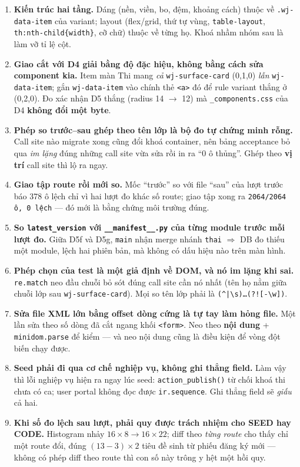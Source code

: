 \begin{enumerate}
\item \textbf{Kiến trúc hai tầng.} Dáng (nền, viền, bo, đệm, khoảng cách) thuộc về
  \texttt{.wj-data-item} của variant; layout (flex/grid, thứ tự vùng, \texttt{table-layout},
  \texttt{th:nth-child\{width\}}, cỡ chữ) thuộc về từng họ. Khoá nhầm nhóm sau là làm vỡ tỉ lệ cột.
\item \textbf{Giao cắt với D4 giải bằng độ đặc hiệu, không bằng cách sửa component kia.} Item màn
  Thi mang \emph{cả} \texttt{wj-surface-card} (0,1,0) \emph{lẫn} \texttt{wj-data-item}; gắn
  \texttt{wj-data-item} vào chính thẻ \texttt{<a>} đó để rule variant thắng ở (0,2,0). Đo xác nhận
  D5 thắng (radius 14 $\to$ 12) mà \texttt{\_components.css} của D4 \textbf{không đổi một byte}.
\item \textbf{Phép so trước--sau ghép theo tên lớp là bộ đo tự chứng minh rỗng.} Call site nào
  migrate xong cũng đổi khoá container, nên bảng acceptance bỏ qua \emph{im lặng} đúng những call
  site vừa sửa rồi in ra ``0 ô thủng''. Ghép theo \textbf{vị trí} call site thì lộ ra ngay.
\item \textbf{Giao tập route rồi mới so.} Mốc ``trước'' so với file ``sau'' của lượt trước báo 378
  ô lệch chỉ vì hai lượt đo khác số route; giao tập xong ra \texttt{2064/2064 ô, 0 lệch} --- đó mới
  là bằng chứng môi trường đúng.
\item \textbf{So \texttt{latest\_version} với \texttt{\_\_manifest\_\_.py} của từng module trước mỗi
  lượt đo.} Giữa D5f và D5g, \texttt{main} nhận merge nhánh \texttt{thai} $\Rightarrow$ DB đo thiếu
  một module, lệch hai phiên bản, mà không có dấu hiệu nào trên màn hình.
\item \textbf{Phép chọn của test là một giả định về DOM, và nó im lặng khi sai.}
  \texttt{re.match} neo đầu chuỗi bỏ sót đúng call site cần nó nhất (tên họ nằm giữa chuỗi lớp sau
  \texttt{wj-surface-card}). Mọi so tên lớp phải là \texttt{(\^{}|\textbackslash s)\ldots(?![-\textbackslash w])}.
\item \textbf{Sửa file XML lớn bằng offset dòng cứng là tự tay làm hỏng file.} Một lần sửa theo số
  dòng đã cắt ngang khối \texttt{<form>}. Neo theo \textbf{nội dung} + \texttt{minidom.parse} để
  kiểm --- và neo nội dung cũng là điều kiện để vòng đột biến chạy được.
\item \textbf{Seed phải đi qua cơ chế nghiệp vụ, không ghi thẳng field.} Làm vậy thì lỗi nghiệp vụ
  hiện ra ngay lúc seed: \texttt{action\_publish()} từ chối khoá thi chưa có ca; user portal không
  đọc được \texttt{ir.sequence}. Ghi thẳng field sẽ \emph{giấu} cả hai.
\item \textbf{Khi số đo lệch sau lượt, phải quy được trách nhiệm cho SEED hay CODE.} Histogram nhảy
  $16\times8 \to 16\times22$; diff theo \emph{từng route} cho thấy chỉ một route đổi, đúng
  $(13-3)\times2$ tiêu đề sinh từ phiếu đăng ký mới --- không có phép diff theo route thì con số này
  trông y hệt một hồi quy.
\end{enumerate}

